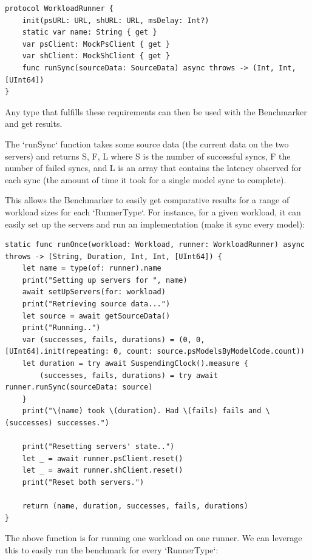 \begin{verbatim}
protocol WorkloadRunner {
    init(psURL: URL, shURL: URL, msDelay: Int?)
    static var name: String { get }
    var psClient: MockPsClient { get }
    var shClient: MockShClient { get }
    func runSync(sourceData: SourceData) async throws -> (Int, Int, [UInt64])
}
\end{verbatim}

Any type that fulfills these requirements can then be used with the Benchmarker and get results.

The `runSync` function takes some source data (the current data on the two servers) and returns S, F, L where S is the number of successful syncs, F the number of failed syncs, and L is an array that contains the latency observed for each sync (the amount of time it took for a single model sync to complete).

This allows the Benchmarker to easily get comparative results for a range of workload sizes for each `RunnerType`. For instance, for a given workload, it can easily set up the servers and run an implementation (make it sync every model):

\begin{verbatim}
static func runOnce(workload: Workload, runner: WorkloadRunner) async throws -> (String, Duration, Int, Int, [UInt64]) {
    let name = type(of: runner).name
    print("Setting up servers for ", name)
    await setUpServers(for: workload)
    print("Retrieving source data...")
    let source = await getSourceData()
    print("Running..")
    var (successes, fails, durations) = (0, 0, [UInt64].init(repeating: 0, count: source.psModelsByModelCode.count))
    let duration = try await SuspendingClock().measure {
        (successes, fails, durations) = try await runner.runSync(sourceData: source)
    }
    print("\(name) took \(duration). Had \(fails) fails and \(successes) successes.")
    
    print("Resetting servers' state..")
    let _ = await runner.psClient.reset()
    let _ = await runner.shClient.reset()
    print("Reset both servers.")
    
    return (name, duration, successes, fails, durations)
}
\end{verbatim}

The above function is for running one workload on one runner. We can leverage this to easily run the benchmark for every `RunnerType`:

